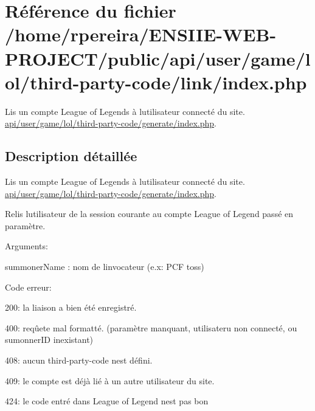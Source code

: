 \hypertarget{user_2game_2lol_2third-party-code_2link_2index_8php}{}\section{Référence du fichier /home/rpereira/\+E\+N\+S\+I\+I\+E-\/\+W\+E\+B-\/\+P\+R\+O\+J\+E\+C\+T/public/api/user/game/lol/third-\/party-\/code/link/index.php}
\label{user_2game_2lol_2third-party-code_2link_2index_8php}


Lis un compte League of Legends à l\textquotesingle{}utilisateur connecté du site. \hyperlink{user_2game_2lol_2third-party-code_2generate_2index_8php}{api/user/game/lol/third-\/party-\/code/generate/index.\+php}.  




\subsection{Description détaillée}
Lis un compte League of Legends à l\textquotesingle{}utilisateur connecté du site. \hyperlink{user_2game_2lol_2third-party-code_2generate_2index_8php}{api/user/game/lol/third-\/party-\/code/generate/index.\+php}. 

Relis l\textquotesingle{}utilisateur de la session courante au compte League of Legend passé en paramètre.

Arguments\+:
\begin{DoxyItemize}
\item summoner\+Name \+: nom de l\textquotesingle{}invocateur (e.\+x\+: \textquotesingle{}P\+CF toss\textquotesingle{})
\end{DoxyItemize}

Code erreur\+:
\begin{DoxyItemize}
\item 200\+: la liaison a bien été enregistré.
\item 400\+: reqûete mal formatté. (paramètre manquant, utilisateru non connecté, ou sumonner\+ID inexistant)
\item 408\+: aucun third-\/party-\/code n\textquotesingle{}est défini.
\item 409\+: le compte est déjà lié à un autre utilisateur du site.
\item 424\+: le code entré dans League of Legend n\textquotesingle{}est pas bon
\end{DoxyItemize}



